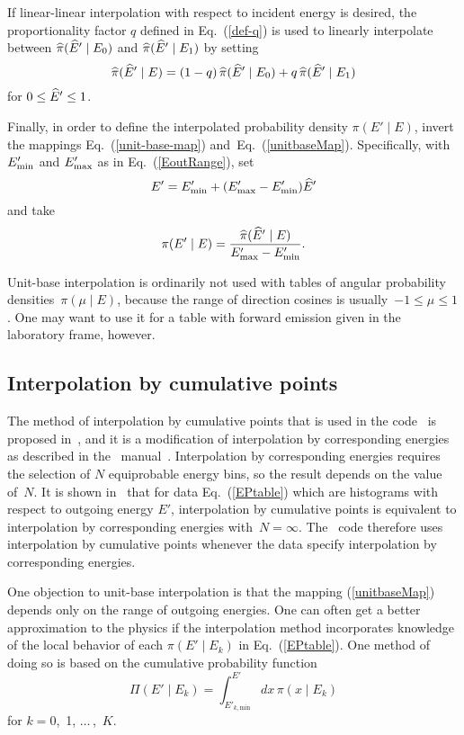 If linear-linear interpolation with respect to incident energy is
desired, the proportionality factor $q$ defined in
Eq.~(\ref{def-q}) is used to linearly interpolate between
$\widehat \pi(\widehat E' \mid E_0)$ and $\widehat \pi(\widehat E' \mid E_1)$
by setting
\begin{equation}
  \widehat \pi(\widehat E' \mid E) = (1 - q)\,\widehat \pi(\widehat E' \mid E_0) +
   q \,\widehat \pi(\widehat E' \mid E_1)
 \label{unitbaseInterp}
\end{equation}
for $0 \le \widehat E' \le 1$. 

Finally, in order to define the interpolated probability
density $\pi(E' \mid E)$, invert the mappings Eq.~(\ref{unit-base-map})
and~Eq.~(\ref{unitbaseMap}).  Specifically, with $E_{\text{min}}'$ and
$E_{\text{max}}'$ as in Eq.~(\ref{EoutRange}), set
\begin{equation}
   E' = E_{\text{min}}' + ( E_{\text{max}}' - E_{\text{min}}')\widehat E'
 \label{range-inv}
\end{equation}
and take
\begin{equation}
  \pi(E' \mid E) = \frac{\widehat \pi(\widehat E' \mid E)}{ E_{\text{max}}' - E_{\text{min}}' }.
 \label{unitbaseInvert}
\end{equation}

Unit-base interpolation is ordinarily not used with tables of
angular probability densities~$\pi( \mu \mid E)$, because the
range of direction cosines is usually~$-1 \le \mu \le 1$.  One
may want to use it for a table with forward emission given in
the laboratory frame, however.

\subsection{Interpolation by cumulative points}\label{Sec:cumProb}
The method of interpolation by cumulative points that is
used in the code \gettransfer\ is proposed in~\cite{interpolation},
and it is a modification of interpolation by corresponding energies as described
in the \ENDF\ manual~\cite{ENDFB}.  
Interpolation by corresponding energies requires the selection of
$N$ equiprobable energy bins, so the result depends on the value of~$N$.
It is shown in~\cite{interpolation} that for data Eq.~(\ref{EPtable}) which are
histograms with respect to outgoing energy $E'$, interpolation by cumulative 
points is equivalent to interpolation by corresponding energies with~$N = \infty$.
The \gettransfer\ code therefore uses interpolation by cumulative points
whenever the data specify interpolation by corresponding energies.

One objection to unit-base interpolation is that the mapping
(\ref{unitbaseMap}) depends only
on the range of outgoing energies.
One can often get a better approximation to the physics if the
interpolation method incorporates
knowledge of the local behavior of each $\pi( E' \mid E_k)$
in Eq.~(\ref{EPtable}).
One method of doing so is based on the cumulative
probability function
\begin{equation}
  \Pi( E' \mid E_k) = \int_{E'_{k,\text{min}}}^{E'} dx\, \pi( x \mid E_k)
  \label{cumProb}
\end{equation}
for $k = 0$,~1, $\ldots\,$,~$K$.





